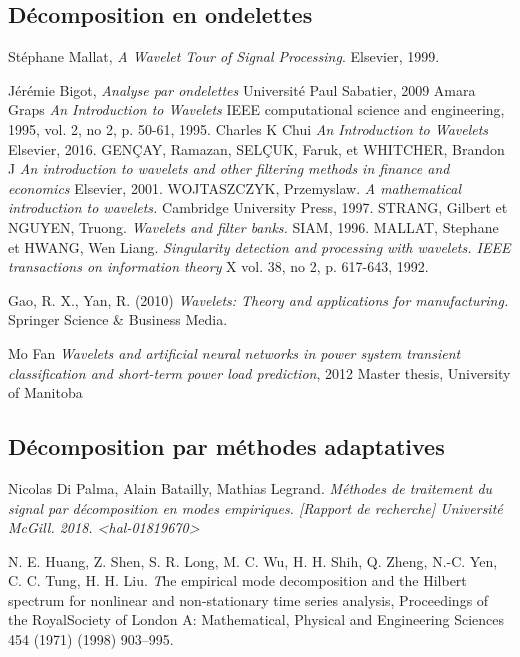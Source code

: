 \begin{thebibliography}{1}
\subsection*{Décomposition en ondelettes}
	  Stéphane Mallat,
	  \emph{A Wavelet Tour of Signal Processing}.
	  Elsevier, 
	  1999.
	  
	Jérémie Bigot,
	\emph{Analyse par ondelettes}
	Université Paul Sabatier,
	2009		  
	Amara Graps
	\emph{An Introduction to Wavelets}
	 IEEE computational science and engineering, 1995, vol. 2, no 2, p. 50-61,
	 1995.
		Charles K Chui
      	\emph{An Introduction to Wavelets}
      	 Elsevier, 2016.
	GENÇAY, Ramazan, SELÇUK, Faruk, et WHITCHER, Brandon J
	 \emph{An introduction to wavelets and other filtering methods in finance and economics} 			      Elsevier, 2001.
  WOJTASZCZYK, Przemyslaw. 
  \emph{A mathematical introduction to wavelets.}
   Cambridge University Press, 1997.
	STRANG, Gilbert et NGUYEN, Truong.
	\emph{Wavelets and filter banks.}
	 SIAM, 1996.
MALLAT, Stephane et HWANG, Wen Liang.
\emph{Singularity detection and processing with wavelets. IEEE transactions on information theory} X vol. 38, no 2, p. 617-643, 1992.  

Gao, R. X., Yan, R. (2010)
\emph{Wavelets: Theory and applications for manufacturing.} 
Springer Science \& Business Media.   

Mo Fan
\emph{Wavelets and artificial neural networks in power system transient classification and short-term power load prediction}, 2012
Master thesis, University of Manitoba   

\subsection*{Décomposition par méthodes adaptatives}
Nicolas Di Palma, Alain Batailly, Mathias Legrand.
\emph{Méthodes de traitement du signal par décomposition en modes empiriques. [Rapport de recherche] Université McGill. 2018. <hal-01819670>}

N. E. Huang, Z. Shen, S. R. Long, M. C. Wu, H. H. Shih, Q. Zheng, N.-C. Yen, C. C. Tung, H. H. Liu.
\emph The empirical mode decomposition and the Hilbert spectrum for nonlinear and non-stationary time series analysis, Proceedings of the RoyalSociety of London A: Mathematical, Physical and Engineering Sciences 454 (1971) (1998) 903–995.


\end{thebibliography}
